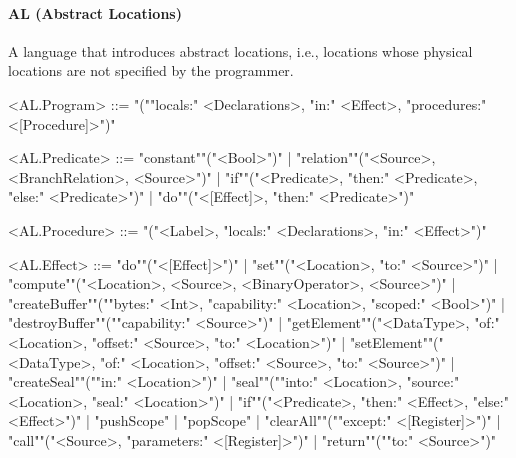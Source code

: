 \documentclass[main.tex]{subfiles}
\begin{document}
\paragraph{ AL (Abstract Locations) } A language that introduces abstract locations, i.e., locations whose physical locations are not specified by the programmer.
\begin{grammar}
	\footnotesize
				<AL.Program> ::=
							"(""locals:" <Declarations>, "in:" <Effect>, "procedures:" <[Procedure]>")"
				\par
				<AL.Predicate> ::=
						"constant""("<Bool>")"
						| "relation""("<Source>, <BranchRelation>, <Source>")"
						| "if""("<Predicate>, "then:" <Predicate>, "else:" <Predicate>")"
						| "do""("<[Effect]>, "then:" <Predicate>")"
				\par
				<AL.Procedure> ::=
							"("<Label>, "locals:" <Declarations>, "in:" <Effect>")"
				\par
				<AL.Effect> ::=
						"do""("<[Effect]>")"
						| "set""("<Location>, "to:" <Source>")"
						| "compute""("<Location>, <Source>, <BinaryOperator>, <Source>")"
						| "createBuffer""(""bytes:" <Int>, "capability:" <Location>, "scoped:" <Bool>")"
						| "destroyBuffer""(""capability:" <Source>")"
						| "getElement""("<DataType>, "of:" <Location>, "offset:" <Source>, "to:" <Location>")"
						| "setElement""("<DataType>, "of:" <Location>, "offset:" <Source>, "to:" <Source>")"
						| "createSeal""(""in:" <Location>")"
						| "seal""(""into:" <Location>, "source:" <Location>, "seal:" <Location>")"
						| "if""("<Predicate>, "then:" <Effect>, "else:" <Effect>")"
						| "pushScope"
						| "popScope"
						| "clearAll""(""except:" <[Register]>")"
						| "call""("<Source>, "parameters:" <[Register]>")"
						| "return""(""to:" <Source>")"
				\par
\end{grammar}
\par
\end{document}
